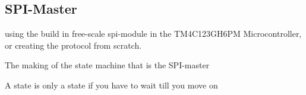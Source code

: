 \subsection{SPI-Master}
\label{sec:SPIMaster}

using the build in free-scale spi-module in the TM4C123GH6PM Microcontroller, or creating the protocol from scratch. 

The making of the state machine that is the SPI-master

A state is only a state if you have to wait till you move on
